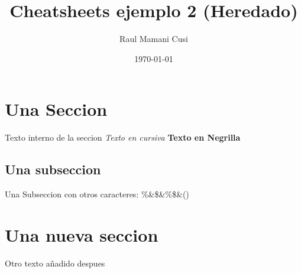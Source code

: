 \documentclass{article}%
\title{Cheatsheets ejemplo 2 (Heredado)}%
\author{Raul Mamani Cusi}%
\date{\today}%
\begin{document}
%
\normalsize%
\maketitle%
\section{Una Seccion}%
\label{sec:UnaSeccion}%
Texto interno de la seccion%
\textit{Texto en cursiva}%
\textbf{Texto en Negrilla}%
\subsection{Una subseccion}%
\label{subsec:Unasubseccion}%
Una Subseccion con otros caracteres: \%\&\$\&\%\$\&()

%
\section{Una nueva seccion}%
\label{sec:Unanuevaseccion}%
Otro texto añadido despues

%
\end{document}

